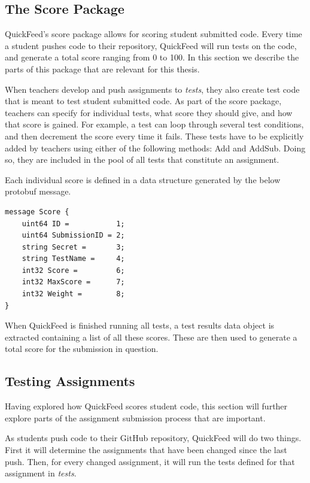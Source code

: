\subsection{The Score Package}
\label{sec:the-score-package}

QuickFeed's score package allows for scoring student submitted code.
Every time a student pushes code to their repository, QuickFeed will run tests on the code, and generate a total score ranging from 0 to 100.
In this section we describe the parts of this package that are relevant for this thesis.

When teachers develop and push assignments to \textit{tests}, they also create test code that is meant to test student submitted code.
As part of the score package, teachers can specify for individual tests, what score they should give, and how that score is gained.
For example, a test can loop through several test conditions, and then decrement the score every time it fails.
These tests have to be explicitly added by teachers using either of the following methods: Add and AddSub.
Doing so, they are included in the pool of all tests that constitute an assignment.

Each individual score is defined in a data structure generated by the below protobuf message.

\begin{lstlisting}[caption={Score message}]
message Score {
    uint64 ID =           1;
    uint64 SubmissionID = 2;
    string Secret =       3;
    string TestName =     4;
    int32 Score =         6;
    int32 MaxScore =      7;
    int32 Weight =        8;
}
\end{lstlisting}

When QuickFeed is finished running all tests, a test results data object is extracted containing a list of all these scores.
These are then used to generate a total score for the submission in question.

\subsection{Testing Assignments}

Having explored how QuickFeed scores student code, this section will further explore parts of the assignment submission process that are important.

As students push code to their GitHub repository, QuickFeed will do two things.
First it will determine the assignments that have been changed since the last push.
Then, for every changed assignment, it will run the tests defined for that assignment in \textit{tests}.

